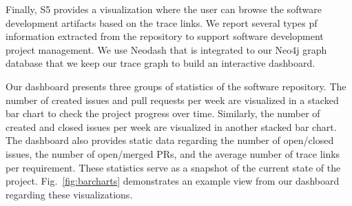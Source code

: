 Finally, \textsf{S5} provides a visualization where the user can browse the software development artifacts based on the trace links. 
We report several types pf information extracted from the repository to support software development project management. We use Neodash that is integrated to our Neo4j graph database that we keep our trace graph to build an interactive dashboard.

Our dashboard presents three groups of  statistics of the software repository.  The number of created issues and pull requests per week  are visualized in a stacked bar chart to check the project progress over time. Similarly, the number of created and closed issues per week are visualized in another stacked bar chart. The dashboard also provides static data regarding the number of open/closed issues, the number of open/merged PRs, and the average number of trace links per requirement. These statistics serve as a snapshot of the current state of the project. Fig.~\ref{fig:barcharts} demonstrates an example view from our dashboard regarding these visualizations.





